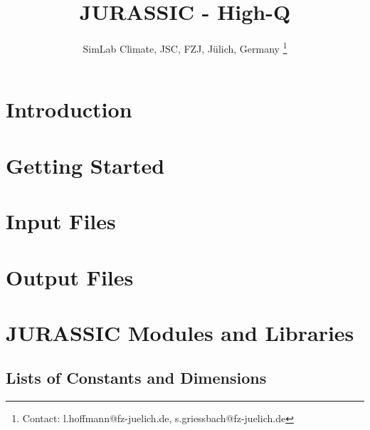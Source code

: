 \documentclass[12pt,a4paper,titlepage,twoside]{article}
\begin{document}

\author{SimLab Climate, JSC, FZJ, J\"u{}lich, Germany \footnote{Contact: l.hoffmann@fz-juelich.de, s.griessbach@fz-juelich.de}}
\title{JURASSIC - High-Q}

\maketitle
\tableofcontents
\clearpage

\section{Introduction}

\clearpage

\section{Getting Started}

\clearpage

\section{Input Files}
\label{sec:Input}

\clearpage

\section{Output Files}
\label{sec:Output}

\clearpage

\section{JURASSIC Modules and Libraries}
\label{sec:Modules}

\clearpage

\begin{appendix}
\section{Lists of Constants and Dimensions}

\end{appendix}

\clearpage
{}



%
\end{document}
